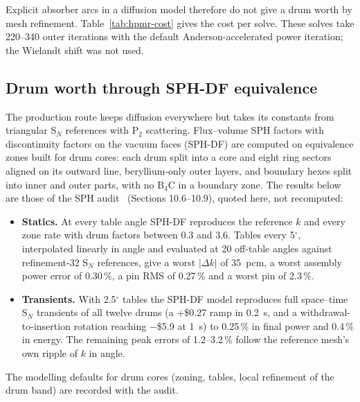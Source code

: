 \documentclass[a4paper,10pt]{article}
\newcommand{\tablefile}[1]{\begin{center}\resizebox{\ifdim\width>\textwidth\textwidth\else\width\fi}{!}{}\end{center}}
\begin{document}
Explicit absorber arcs in a diffusion model therefore do not give a drum worth by
mesh refinement. Table~\ref{tab:hpmr-cost}
gives the cost per solve. These solves take 220--340 outer iterations with the
default Anderson-accelerated power iteration; the Wielandt shift was not used.

\begin{table}[htbp]
\tablefile{hpmr_cost}
\caption{Cost per HP-MR eigenvalue solve: mean over the seven angles on one CPU
core (refinements 4--16) and over the two end angles on one A100 (refinement 32),
one run each.}
\label{tab:hpmr-cost}
\end{table}

\subsection{Drum worth through SPH-DF equivalence}

The production route keeps diffusion everywhere but takes its constants from
triangular S$_N$ references with P$_2$ scattering. Flux--volume SPH factors with
discontinuity factors on the vacuum faces (SPH-DF) are computed on equivalence
zones built for drum cores: each drum split into a core and eight ring sectors
aligned on its outward line, beryllium-only outer layers, and boundary hexes
split into inner and outer parts, with no B$_4$C in a boundary zone. The
results below are those of the SPH audit~\cite{sphaudit} (Sections 10.6--10.9),
quoted here, not recomputed:
\begin{itemize}
\item \textbf{Statics.} At every table angle SPH-DF reproduces the reference $k$ and
  every zone rate with drum factors between 0.3 and 3.6. Tables every 5$^\circ$,
  interpolated linearly in angle and evaluated at 20 off-table angles against
  refinement-32 S$_N$ references, give a worst $|\Delta k|$ of 35~pcm, a worst
  assembly power error of 0.30\,\%, a pin RMS of 0.27\,\% and a worst pin of
  2.3\,\%.
\item \textbf{Transients.} With 2.5$^\circ$ tables the SPH-DF model reproduces full
  space--time S$_N$ transients of all twelve drums (a +\$0.27 ramp in 0.2~s, and a
  withdrawal-to-insertion rotation reaching $-$\$5.9 at 1~s) to 0.25\,\% in final
  power and 0.4\,\% in energy. The remaining peak errors of 1.2--3.2\,\% follow the
  reference mesh's own ripple of $k$ in angle.
\end{itemize}
The modelling defaults for drum cores (zoning, tables, local refinement of the
drum band) are recorded with the audit.
\end{document}
